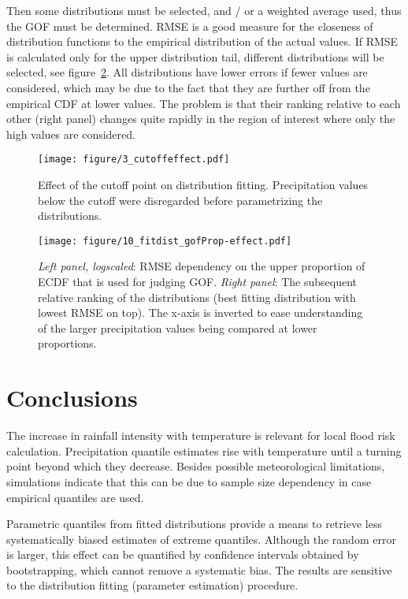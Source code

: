 \documentclass[a4paper]{article}
\begin{document}
\begin{multicols}{2}
Then some distributions must be selected, and / or a weighted average used, thus the GOF must be determined.
RMSE is a good measure for the closeness of distribution functions to the empirical distribution of the actual values.
If RMSE is calculated only for the upper distribution tail, different distributions will be selected, see
figure~\ref{fig:gofPropeffect}.
All distributions have lower errors if fewer values are considered, which may be due to the fact that they are further off from the empirical CDF at lower values. 
The problem is that their ranking relative to each other (right panel) changes quite rapidly in the region of interest where only the high values are considered.

\end{multicols}

\begin{figure}[H] %
\texttt{[image: figure/3\_cutoffeffect.pdf]}
\caption[Threshold effect on distribution]{Effect of the cutoff point on distribution fitting. Precipitation values below the cutoff were disregarded before parametrizing the distributions.}
\label{fig:cutoffeffect1}
\end{figure}

\begin{figure}[H] %
\texttt{[image: figure/10\_fitdist\_gofProp-effect.pdf]}
\caption[Effect of GOF-focus on dist selection]{\textit{Left panel, logscaled}: RMSE dependency on the upper proportion of ECDF that is used for judging GOF. \textit{Right panel}: The subsequent relative ranking of the distributions (best fitting distribution with lowest RMSE on top). The x-axis is inverted to ease understanding of the larger precipitation values being compared at lower proportions.}
\label{fig:gofPropeffect}
\end{figure}


\pagebreak
\section{Conclusions} %

\begin{multicols}{2}
The increase in rainfall intensity with temperature is relevant for local flood risk calculation.
Precipitation quantile estimates rise with temperature until a turning point beyond which they decrease.
Besides possible meteorological limitations, simulations indicate that this can be due to sample size dependency in case empirical quantiles are used. 

Parametric quantiles from fitted distributions provide a means to retrieve less systematically biased estimates of extreme quantiles. 
Although the random error is larger, this effect can be quantified by confidence intervals obtained by bootstrapping, which cannot remove a systematic bias.
The results are sensitive to the distribution fitting (parameter estimation) procedure.
\end{multicols}
\end{document}
